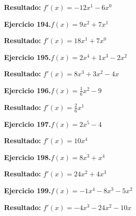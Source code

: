 \documentclass[10pt,a4paper]{article}
\begin{document}
\begin{solbox}
\textbf{Resultado:} \(\displaystyle f'(x) = -12x^{1} -6x^{0}\)
\end{solbox}

\begin{ejbox}
\textbf{Ejercicio 194.}\quad $f(x) = 9x^{2} + 7x^{1}$
\end{ejbox}

\begin{solbox}
\textbf{Resultado:} \(\displaystyle f'(x) = 18x^{1} + 7x^{0}\)
\end{solbox}

\begin{ejbox}
\textbf{Ejercicio 195.}\quad $f(x) = 2x^4 +1x^3 -2x^2$
\end{ejbox}

\begin{solbox}
\textbf{Resultado:} \(\displaystyle f'(x) = 8x^3 +3x^2 -4x\)
\end{solbox}

\newpage
\begin{ejbox}
\textbf{Ejercicio 196.}\quad $f(x) = \frac{1}{6}x^{2} -9$
\end{ejbox}

\begin{solbox}
\textbf{Resultado:} \(\displaystyle f'(x) = \frac{2}{6}x^{1}\)
\end{solbox}

\begin{ejbox}
\textbf{Ejercicio 197.}\quad $f(x) = 2x^{5} -4$
\end{ejbox}

\begin{solbox}
\textbf{Resultado:} \(\displaystyle f'(x) = 10x^{4}\)
\end{solbox}

\begin{ejbox}
\textbf{Ejercicio 198.}\quad $f(x) = 8x^{3} + x^{4}$
\end{ejbox}

\begin{solbox}
\textbf{Resultado:} \(\displaystyle f'(x) = 24x^{2} + 4x^{3}\)
\end{solbox}

\newpage
\begin{ejbox}
\textbf{Ejercicio 199.}\quad $f(x) = -1x^4 -8x^3 -5x^2$
\end{ejbox}

\begin{solbox}
\textbf{Resultado:} \(\displaystyle f'(x) = -4x^3 -24x^2 -10x\)
\end{solbox}
\end{document}
